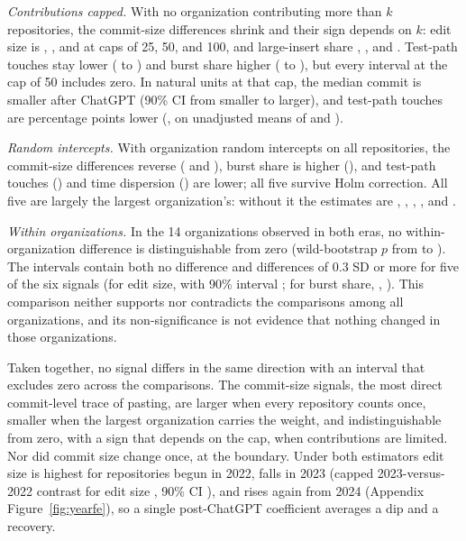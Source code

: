 \documentclass[acmsmall,screen,review,anonymous]{acmart}
\begin{document}
\textit{Contributions capped.} With no organization contributing more than $k$ repositories, the commit-size differences shrink and their sign depends on $k$: edit size is , , and  at caps of 25, 50, and 100, and large-insert share , , and . Test-path touches stay lower ( to ) and burst share higher ( to ), but every interval at the cap of 50 includes zero. In natural units at that cap, the median commit is  smaller after ChatGPT (90\% CI from  smaller to  larger), and test-path touches are  percentage points lower (, on unadjusted means of  and ).

\textit{Random intercepts.} With organization random intercepts on all repositories, the commit-size differences reverse ( and ), burst share is higher (), and test-path touches () and time dispersion () are lower; all five survive Holm correction. All five are largely the largest organization's: without it the estimates are , , , , and .

\textit{Within organizations.} In the 14 organizations observed in both eras, no within-organization difference is distinguishable from zero (wild-bootstrap $p$ from  to ). The intervals contain both no difference and differences of 0.3 SD or more for five of the six signals (for edit size,  with 90\% interval ; for burst share, , ). This comparison neither supports nor contradicts the comparisons among all organizations, and its non-significance is not evidence that nothing changed in those organizations.

Taken together, no signal differs in the same direction with an interval that excludes zero across the comparisons. The commit-size signals, the most direct commit-level trace of pasting, are larger when every repository counts once, smaller when the largest organization carries the weight, and indistinguishable from zero, with a sign that depends on the cap, when contributions are limited. Nor did commit size change once, at the boundary. Under both estimators edit size is highest for repositories begun in 2022, falls in 2023 (capped 2023-versus-2022 contrast for edit size , 90\% CI ), and rises again from 2024 (Appendix Figure~\ref{fig:yearfe}), so a single post-ChatGPT coefficient averages a dip and a recovery.
\end{document}
